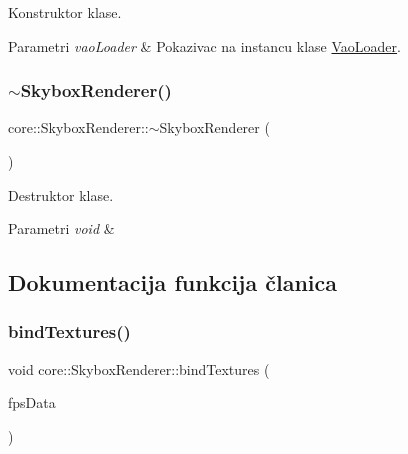 Konstruktor klase. 


\begin{DoxyParams}{Parametri}
{\em vao\+Loader} & Pokazivac na instancu klase \hyperlink{classcore_1_1VaoLoader}{Vao\+Loader}. \\
\hline
\end{DoxyParams}
\mbox{\label{classcore_1_1SkyboxRenderer_aa2c93db248d8df20a05823139e8751a7}} 
\subsubsection{\texorpdfstring{$\sim$\+Skybox\+Renderer()}{~SkyboxRenderer()}}
{\footnotesize\ttfamily core\+::\+Skybox\+Renderer\+::$\sim$\+Skybox\+Renderer (\begin{DoxyParamCaption}{ }\end{DoxyParamCaption})}



Destruktor klase. 


\begin{DoxyParams}{Parametri}
{\em void} & \\
\hline
\end{DoxyParams}


\subsection{Dokumentacija funkcija članica}
\mbox{\label{classcore_1_1SkyboxRenderer_a555969e8b9ba0bf2a2dea2756974c3b6}} 
\subsubsection{\texorpdfstring{bind\+Textures()}{bindTextures()}}
{\footnotesize\ttfamily void core\+::\+Skybox\+Renderer\+::bind\+Textures (\begin{DoxyParamCaption}\item[{\hyperlink{classutility_1_1FpsData}{Fps\+Data} $\ast$}]{fps\+Data }\end{DoxyParamCaption})\hspace{0.3cm}{\ttfamily [private]}}



